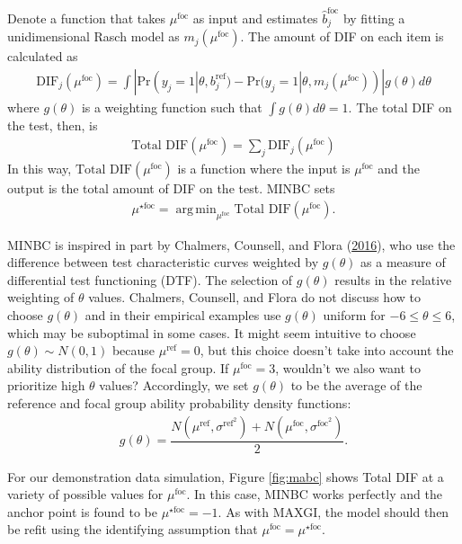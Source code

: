 \documentclass[
  11pt,
]{article}
\begin{document}
Denote a function that takes \(\mu^\text{foc}\) as input and estimates \(\hat b_j^\text{foc}\) by fitting a unidimensional Rasch model as \(m_j(\mu^\text{foc})\). The amount of DIF on each item is calculated as
\begin{align}
\text{DIF}_j(\mu^\text{foc}) = \int |\text{Pr}(y_j = 1| \theta, b_j^{\text{ref}}) - \text{Pr}(y_j = 1| \theta, m_j(\mu^\text{foc}))| g(\theta)d\theta
\end{align}
where \(g(\theta)\) is a weighting function such that \(\int g(\theta)d\theta = 1\). The total DIF on the test, then, is
\begin{align}
\text{Total DIF}(\mu^\text{foc}) = \sum_{j} \text{DIF}_j(\mu^\text{foc})
\end{align}
In this way, \(\text{Total DIF}(\mu^\text{foc})\) is a function where the input is \(\mu^\text{foc}\) and the output is the total amount of DIF on the test. MINBC sets
\begin{align}
\mu^{\star\text{foc}} = \mathop\mathrm{arg\,min}_{\mu^\text{foc}} \text{Total DIF}(\mu^\text{foc}).
\end{align}

MINBC is inspired in part by Chalmers, Counsell, and Flora (\protect\hyperlink{ref-chalmers2016might}{2016}), who use the difference between test characteristic curves weighted by \(g(\theta)\) as a measure of differential test functioning (DTF). The selection of \(g(\theta)\) results in the relative weighting of \(\theta\) values. Chalmers, Counsell, and Flora do not discuss how to choose \(g(\theta)\) and in their empirical examples use \(g(\theta)\) uniform for \(-6 \le \theta \le 6\), which may be suboptimal in some cases. It might seem intuitive to choose \(g(\theta) \sim N(0, 1)\) because \(\mu^\text{ref} = 0\), but this choice doesn't take into account the ability distribution of the focal group. If \(\mu^\text{foc} = 3\), wouldn't we also want to prioritize high \(\theta\) values? Accordingly, we set \(g(\theta)\) to be the average of the reference and focal group ability probability density functions:
\begin{align}
g(\theta) = \dfrac{N(\mu^{\text{ref}}, \sigma^{\text{ref}^2}) + N(\mu^{\text{foc}}, \sigma^{\text{foc}^2})}{2}.
\end{align}

For our demonstration data simulation, Figure \ref{fig:mabc} shows Total DIF at a variety of possible values for \(\mu^\text{foc}\). In this case, MINBC works perfectly and the anchor point is found to be \(\mu^{\star\text{foc}} = -1\). As with MAXGI, the model should then be refit using the identifying assumption that \(\mu^{\text{foc}} = \mu^{\star\text{foc}}\).
\end{document}
